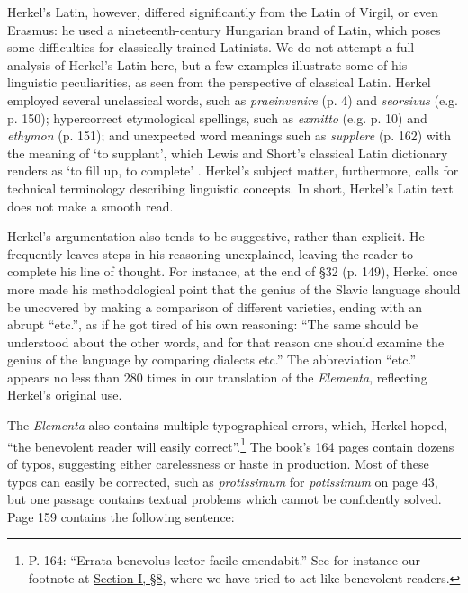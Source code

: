 Herkel’s Latin, however, differed significantly from the Latin of Virgil, or even Erasmus: he used a nineteenth-century Hungarian brand of Latin, which poses some difficulties for classically-trained Latinists. We do not attempt a full analysis of Herkel’s Latin here, but a few examples illustrate some of his linguistic peculiarities, as seen from the perspective of classical Latin. Herkel employed several unclassical words, such as \textit{praeinvenire} (p. 4) and \textit{seorsivus} (e.g. p. 150); hypercorrect etymological spellings, such as \textit{exmitto} (e.g. p. 10) and \textit{ethymon} (p. 151); and unexpected word meanings such as \textit{supplere} (p. 162) with the meaning of ‘to supplant’, which Lewis and Short’s classical Latin dictionary renders as ‘to fill up, to complete’ \citep{lewis_latin_1879}. Herkel’s subject matter, furthermore, calls for technical terminology describing linguistic concepts. In short, Herkel’s Latin text does not make a smooth read.

Herkel’s argumentation also tends to be suggestive, rather than explicit. He frequently leaves steps in his reasoning unexplained, leaving the reader to complete his line of thought. For instance, at the end of §32 (p. 149), Herkel once more made his methodological point that the genius of the Slavic language should be uncovered by making a comparison of different varieties, ending with an abrupt “etc.”, as if he got tired of his own reasoning: “The same should be understood about the other words, and for that reason one should examine the genius of the language by comparing dialects etc.” The abbreviation “etc.” appears no less than 280 times in our translation of the \textit{Elementa}, reflecting Herkel’s original use.

The \textit{Elementa} also contains multiple typographical errors, which, Herkel ho\-ped, “the benevolent reader will easily correct”.\footnote{P. 164: “Errata benevolus lector facile emendabit.” See for instance our footnote at \hyperref[sec:3-1-8]{Section I, §8}, where we have tried to act like benevolent readers.} The book’s 164 pages contain dozens of typos, suggesting either carelessness or haste in production. Most of these typos can easily be corrected, such as \textit{protissimum} for \textit{potissimum} on page 43, but one passage contains textual problems which cannot be confidently solved. Page 159 contains the following sentence:

